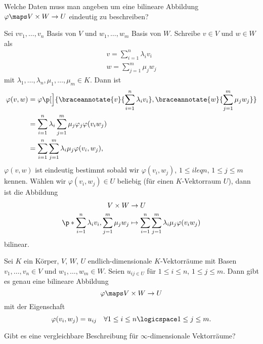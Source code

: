 \begin{frage*}
  Welche Daten muss man angeben um eine bilineare Abbildung \( \varphi\maps V\times W\to U \) eindeutig zu beschreiben?
\end{frage*}
\begin{idee*}
  Sei \( vv_1,\dotsc,v_n \) Basis von \( V \) und \( w_1,\dotsc,w_m \) Basis von \( W \). Schreibe \( v\in V \) und \( w\in W \) als
  \begin{gather*}
    v=\sum_{i=1}^{n}\lambda_i v_i\\
    w=\sum_{j=1}^{m}\mu_j w_j
  \end{gather*}
  mit \( \lambda_1,\dotsc,\lambda_n,\mu_1,\dotsc,\mu_m\in K \). Dann ist
  \begin{align*}
    \varphi(v,w)&=\varphi\p[\Big]{\braceannotate{v}{\sum_{i=1}^{n}\lambda_i v_i},\braceannotate{w}{\sum_{j=1}^{m}\mu_j w_j}}\\
    &=\sum_{i=1}^{n}\lambda_i \sum_{j=1}^{m}\mu_j \varphi_j \varphi(v_i w_j)\\
    &=\sum_{i=1}^{n}\sum_{j=1}^{m}\lambda_i \mu_j \varphi(v_i,w_j),
  \end{align*}
  \dh \( \varphi(v,w) \) ist eindeutig bestimmt sobald wir \( \varphi(v_i,w_j) \), \( 1\leq i leq n \), \( 1\leq j\leq m \) kennen. Wählen wir \( \varphi(v_i,w_j)\in U \) beliebig (für einen \( K \)-Vektorraum \( U \)), dann ist die Abbildung
  \begin{align*}
    V\times W&\to U\\
    \p*{\sum_{i=1}^{n}\lambda_i v_i, \sum_{j=1}^{m}\mu_j w_j}&\mapsto \sum_{i=1}^{n}\sum_{j=1}^{m}\lambda_i \mu_j \varphi(v_i w_j)
  \end{align*}
  bilinear.
\end{idee*}
\begin{lemma}\label{bilineare_abbildung_eindeutig_bestimmt}
  Sei \( K \) ein Körper, \( V \), \( W \), \( U \) endlich-dimensionale \( K \)-Vektorräume mit Basen \( v_1,\dotsc,v_n\in V \) und \( w_1,\dotsc,w_m\in W \). Seien \( u_{ij\in U} \) für \( 1\leq i\leq n \), \( 1\leq j\leq m \). Dann gibt es genau eine bilineare Abbildung
  \begin{equation*}
    \varphi\maps V\times W\to U
  \end{equation*}
  mit der Eigenschaft
  \begin{equation*}
    \varphi(v_i,w_j)=u_{ij}\quad \forall 1\leq i\leq n\logicspace 1\leq j\leq m.
  \end{equation*}
\end{lemma}
\begin{frage*}
  Gibt es eine vergleichbare Beschreibung für \( \infty \)-dimensionale Vektorräume?
\end{frage*}
